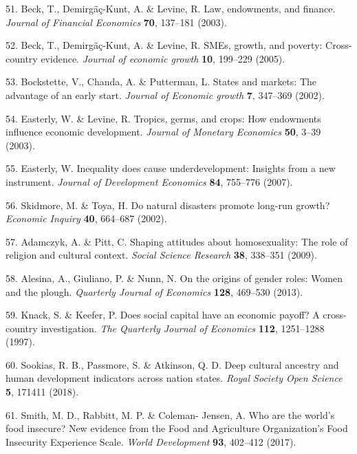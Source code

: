 \documentclass[english,man,floatsintext]{apa6}
\begin{document}
\leavevmode\hypertarget{ref-Beck2003}{}%
51. Beck, T., Demirgäç-Kunt, A. \& Levine, R. Law, endowments, and finance. \emph{Journal of Financial Economics} \textbf{70}, 137--181 (2003).

\leavevmode\hypertarget{ref-Beck2005}{}%
52. Beck, T., Demirgäç-Kunt, A. \& Levine, R. SMEs, growth, and poverty: Cross-country evidence. \emph{Journal of economic growth} \textbf{10}, 199--229 (2005).

\leavevmode\hypertarget{ref-Bockstette2002}{}%
53. Bockstette, V., Chanda, A. \& Putterman, L. States and markets: The advantage of an early start. \emph{Journal of Economic growth} \textbf{7}, 347--369 (2002).

\leavevmode\hypertarget{ref-Easterly2003}{}%
54. Easterly, W. \& Levine, R. Tropics, germs, and crops: How endowments influence economic development. \emph{Journal of Monetary Economics} \textbf{50}, 3--39 (2003).

\leavevmode\hypertarget{ref-Easterly2007}{}%
55. Easterly, W. Inequality does cause underdevelopment: Insights from a new instrument. \emph{Journal of Development Economics} \textbf{84}, 755--776 (2007).

\leavevmode\hypertarget{ref-Skidmore2002}{}%
56. Skidmore, M. \& Toya, H. Do natural disasters promote long-run growth? \emph{Economic Inquiry} \textbf{40}, 664--687 (2002).

\leavevmode\hypertarget{ref-Adamczyk2009}{}%
57. Adamczyk, A. \& Pitt, C. Shaping attitudes about homosexuality: The role of religion and cultural context. \emph{Social Science Research} \textbf{38}, 338--351 (2009).

\leavevmode\hypertarget{ref-Alesina2013}{}%
58. Alesina, A., Giuliano, P. \& Nunn, N. On the origins of gender roles: Women and the plough. \emph{Quarterly Journal of Economics} \textbf{128}, 469--530 (2013).

\leavevmode\hypertarget{ref-Knack1997}{}%
59. Knack, S. \& Keefer, P. Does social capital have an economic payoff? A cross-country investigation. \emph{The Quarterly Journal of Economics} \textbf{112}, 1251--1288 (1997).

\leavevmode\hypertarget{ref-Sookias2018}{}%
60. Sookias, R. B., Passmore, S. \& Atkinson, Q. D. Deep cultural ancestry and human development indicators across nation states. \emph{Royal Society Open Science} \textbf{5}, 171411 (2018).

\leavevmode\hypertarget{ref-Smith2017}{}%
61. Smith, M. D., Rabbitt, M. P. \& Coleman- Jensen, A. Who are the world's food insecure? New evidence from the Food and Agriculture Organization's Food Insecurity Experience Scale. \emph{World Development} \textbf{93}, 402--412 (2017).
\end{document}
